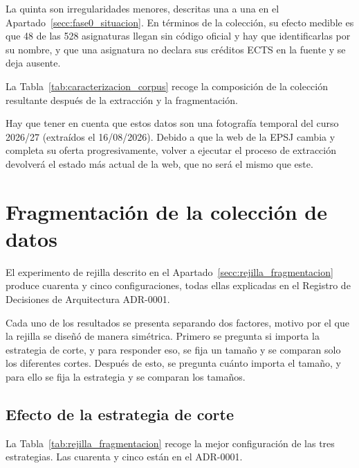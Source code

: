 La quinta son irregularidades menores, descritas una a una en el
  Apartado~\ref{secc:fase0_situacion}. En términos de la colección, su efecto medible es
  que 48 de las 528 asignaturas llegan sin código oficial y hay que identificarlas por su
  nombre, y que una asignatura no declara sus créditos ECTS en la fuente y se deja
  ausente.

La Tabla~\ref{tab:caracterizacion_corpus} recoge la composición de la
  colección resultante después de la extracción y la fragmentación.





Hay que tener en cuenta que estos datos son una fotografía temporal del curso 2026/27 (extraídos el 16/08/2026). Debido a que la web de la EPSJ cambia y completa su oferta progresivamente, volver a ejecutar el proceso de extracción devolverá el estado más actual de la web, que no será el mismo que este.


\section[Fragmentación de la colección de datos]{Fragmentación de la colección de datos}
\label{secc:resultados_fragmentacion}


El experimento de rejilla descrito en el Apartado~\ref{secc:rejilla_fragmentacion} produce cuarenta y cinco configuraciones, todas ellas explicadas en el Registro de Decisiones de Arquitectura \mbox{ADR-0001}\cite{repo_tfg}. 

Cada uno de los resultados se presenta separando dos factores, motivo por el que la rejilla se diseñó de manera simétrica. Primero se pregunta si importa la estrategia de corte, y para responder eso, se fija un tamaño y se comparan solo los diferentes cortes. Después de esto, se pregunta cuánto importa el tamaño, y para ello se fija la estrategia y se comparan los tamaños.

\subsection[Efecto de la estrategia de corte]{Efecto de la estrategia de corte}
\label{secc:rejilla_estrategia}

La Tabla~\ref{tab:rejilla_fragmentacion} recoge la mejor configuración
de las tres estrategias. Las cuarenta y cinco están en el ADR-0001\cite{repo_tfg}.



